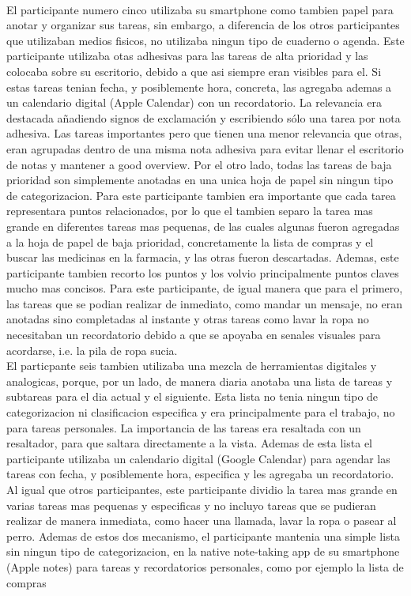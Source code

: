 \\
El participante numero cinco utilizaba su smartphone como tambien papel para anotar y organizar sus tareas, sin embargo, a diferencia de los otros participantes que utilizaban medios fisicos, no utilizaba ningun tipo de cuaderno o agenda. Este participante utilizaba otas adhesivas para las tareas de alta prioridad y las colocaba sobre su escritorio, debido a que asi siempre eran visibles para el. Si estas tareas tenian fecha, y posiblemente hora, concreta, las agregaba ademas a un calendario digital (Apple Calendar) con un recordatorio. La relevancia era destacada añadiendo signos de exclamación y escribiendo sólo una tarea por nota adhesiva. Las tareas importantes pero que tienen una menor relevancia que otras, eran agrupadas dentro de una misma nota adhesiva para evitar llenar el escritorio de notas y mantener a good overview. Por el otro lado, todas las tareas de baja prioridad son simplemente anotadas en una unica hoja de papel sin ningun tipo de categorizacion. Para este participante tambien era importante que cada tarea representara puntos relacionados, por lo que el tambien separo la tarea mas grande en diferentes tareas mas pequenas, de las cuales algunas fueron agregadas a la hoja de papel de baja prioridad, concretamente la lista de compras y el buscar las medicinas en la farmacia, y las otras fueron descartadas. Ademas, este participante tambien recorto los puntos y los volvio principalmente puntos claves mucho mas concisos. Para este participante, de igual manera que para el primero, las tareas que se podian realizar de inmediato, como mandar un mensaje, no eran anotadas sino completadas al instante y otras tareas como lavar la ropa no necesitaban un recordatorio debido a que se apoyaba en senales visuales para acordarse, i.e. la pila de ropa sucia. 
\\
El particpante seis tambien utilizaba una mezcla de herramientas digitales y analogicas, porque, por un lado, de manera diaria anotaba una lista de tareas y subtareas para el dia actual y el siguiente. Esta lista no tenia ningun tipo de categorizacion ni clasificacion especifica y era principalmente para el trabajo, no para tareas personales. La importancia de las tareas era resaltada con un resaltador, para que saltara directamente a la vista. Ademas de esta lista el participante utilizaba un calendario digital (Google Calendar) para agendar las tareas con fecha, y posiblemente hora, especifica y les agregaba un recordatorio. Al igual que otros participantes, este participante dividio la tarea mas grande en varias tareas mas pequenas y especificas y no incluyo tareas que se pudieran realizar de manera inmediata, como hacer una llamada, lavar la ropa o pasear al perro. Ademas de estos dos mecanismo, el participante mantenia una simple lista sin ningun tipo de categorizacion, en la native note-taking app de su smartphone (Apple notes) para tareas y recordatorios personales, como por ejemplo la lista de compras

